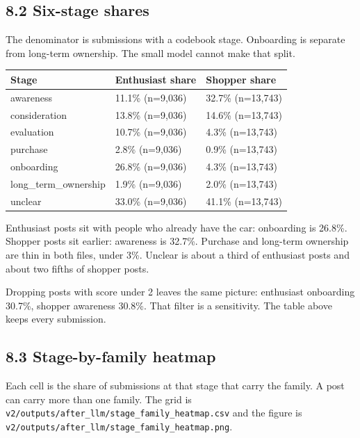 \documentclass[11pt]{article}
\begin{document}
\subsection{8.2 Six-stage shares}

The denominator is submissions with a codebook stage. Onboarding is separate from long-term ownership. The small model cannot make that split.


\begin{longtable}{lll}
\toprule
Stage & Enthusiast share & Shopper share \\
\midrule
awareness & 11.1\% (n=9,036) & 32.7\% (n=13,743) \\
consideration & 13.8\% (n=9,036) & 14.6\% (n=13,743) \\
evaluation & 10.7\% (n=9,036) & 4.3\% (n=13,743) \\
purchase & 2.8\% (n=9,036) & 0.9\% (n=13,743) \\
onboarding & 26.8\% (n=9,036) & 4.3\% (n=13,743) \\
long\_term\_ownership & 1.9\% (n=9,036) & 2.0\% (n=13,743) \\
unclear & 33.0\% (n=9,036) & 41.1\% (n=13,743) \\
\bottomrule
\end{longtable}


Enthusiast posts sit with people who already have the car: onboarding is 26.8\%. Shopper posts sit earlier: awareness is 32.7\%. Purchase and long-term ownership are thin in both files, under 3\%. Unclear is about a third of enthusiast posts and about two fifths of shopper posts.


Dropping posts with score under 2 leaves the same picture: enthusiast onboarding 30.7\%, shopper awareness 30.8\%. That filter is a sensitivity. The table above keeps every submission.


\subsection{8.3 Stage-by-family heatmap}

Each cell is the share of submissions at that stage that carry the family. A post can carry more than one family. The grid is \texttt{v2/outputs/after\_llm/stage\_family\_heatmap.csv} and the figure is \texttt{v2/outputs/after\_llm/stage\_family\_heatmap.png}.
\end{document}
